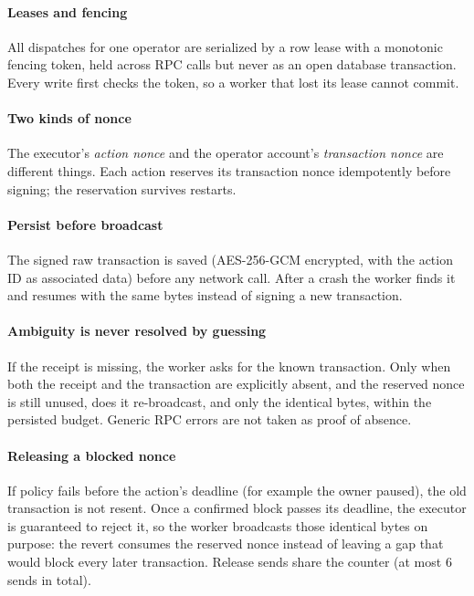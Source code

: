 \paragraph{Leases and fencing} All dispatches for one operator are serialized by a row lease with a monotonic fencing token, held across RPC calls but never as an open database transaction. Every write first checks the token, so a worker that lost its lease cannot commit.

\paragraph{Two kinds of nonce} The executor's \emph{action nonce} and the operator account's \emph{transaction nonce} are different things. Each action reserves its transaction nonce idempotently before signing; the reservation survives restarts.

\paragraph{Persist before broadcast} The signed raw transaction is saved (AES-256-GCM encrypted, with the action ID as associated data) before any network call. After a crash the worker finds it and resumes with the same bytes instead of signing a new transaction.

\paragraph{Ambiguity is never resolved by guessing} If the receipt is missing, the worker asks for the known transaction. Only when both the receipt and the transaction are explicitly absent, and the reserved nonce is still unused, does it re-broadcast, and only the identical bytes, within the persisted budget. Generic RPC errors are not taken as proof of absence.

\paragraph{Releasing a blocked nonce} If policy fails before the action's deadline (for example the owner paused), the old transaction is not resent. Once a confirmed block passes its deadline, the executor is guaranteed to reject it, so the worker broadcasts those identical bytes on purpose: the revert consumes the reserved nonce instead of leaving a gap that would block every later transaction. Release sends share the counter (at most 6 sends in total).

